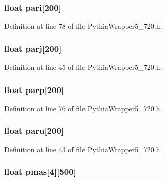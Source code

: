 \subsubsection{\setlength{\rightskip}{0pt plus 5cm}float {\bf pari}[200]}\label{PythiaWrapper5__720_8h_328169dbc046c461db069f1240e71f1d}




Definition at line 78 of file Pythia\-Wrapper5\_\-720.h.
\subsubsection{\setlength{\rightskip}{0pt plus 5cm}float {\bf parj}[200]}\label{PythiaWrapper5__720_8h_6e0ef0cead3d333af0c3106b80129071}




Definition at line 45 of file Pythia\-Wrapper5\_\-720.h.
\subsubsection{\setlength{\rightskip}{0pt plus 5cm}float {\bf parp}[200]}\label{PythiaWrapper5__720_8h_4d6681f7abdae18b01839a2976df783b}




Definition at line 76 of file Pythia\-Wrapper5\_\-720.h.
\subsubsection{\setlength{\rightskip}{0pt plus 5cm}float {\bf paru}[200]}\label{PythiaWrapper5__720_8h_2f7780831f95aeb47e96a56470ebc4d7}




Definition at line 43 of file Pythia\-Wrapper5\_\-720.h.
\subsubsection{\setlength{\rightskip}{0pt plus 5cm}float {\bf pmas}[4][500]}\label{PythiaWrapper5__720_8h_0bb18625f28a1b1e5080b6b01544b3e0}




